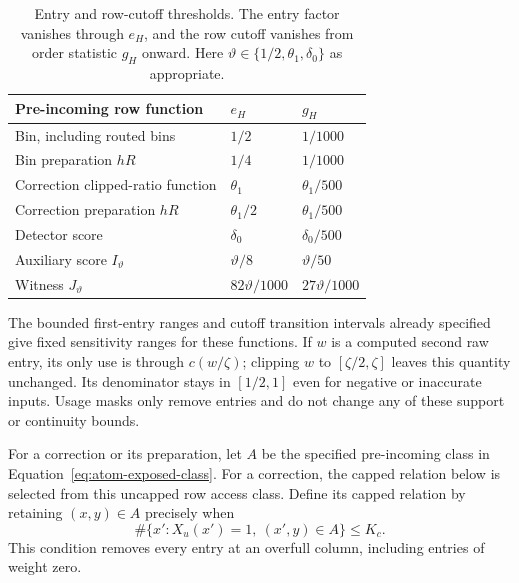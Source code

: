 \begin{table}[htbp]
\centering
\begin{tabular}{@{}lll@{}}
\toprule
Pre-incoming row function & $e_H$ & $g_H$ \\
\midrule
Bin, including routed bins & $1/2$ & $1/1000$ \\
Bin preparation $hR$ & $1/4$ & $1/1000$ \\
Correction clipped-ratio function & $\theta_1$ & $\theta_1/500$ \\
Correction preparation $hR$ & $\theta_1/2$ & $\theta_1/500$ \\
Detector score & $\delta_0$ & $\delta_0/500$ \\
Auxiliary score $I_{\vartheta}$ & $\vartheta/8$ & $\vartheta/50$ \\
Witness $J_{\vartheta}$ & $82\vartheta/1000$ & $27\vartheta/1000$ \\
\bottomrule
\end{tabular}
\caption{Entry and row-cutoff thresholds. The entry factor vanishes through
$e_H$, and the row cutoff vanishes from order statistic $g_H$ onward. Here
$\vartheta\in\{1/2,\theta_1,\delta_0\}$ as appropriate.}
\label{tab:atom-compression-thresholds}
\end{table}

The bounded first-entry ranges and cutoff transition intervals already
specified give fixed sensitivity ranges for these functions.  If $w$
is a computed second raw entry, its only use is through $c(w/\zeta)$;
clipping $w$ to $[\zeta/2,\zeta]$ leaves this quantity unchanged.
Its denominator stays in $[1/2,1]$ even for negative or inaccurate
inputs.  Usage masks only remove entries and do not change any of these
support or continuity bounds.

For a correction or its preparation, let $A$ be the specified
pre-incoming class in Equation~\eqref{eq:atom-exposed-class}.
For a correction, the capped relation below is selected from this
uncapped row access class.
Define its capped relation by retaining $(x,y)\in A$ precisely when
\begin{equation}
 \#\{x':X_u(x')=1,\ (x',y)\in A\}\le K_c.
 \label{eq:atom-port-cap}
\end{equation}
This condition removes every entry at an overfull column, including
entries of weight zero.

